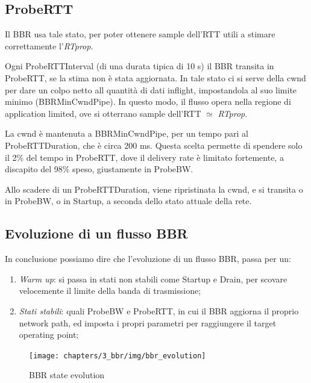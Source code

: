 \subsection{ProbeRTT} \label{ProbeRTT}

Il BBR usa tale stato, per poter ottenere sample dell'RTT utili a stimare correttamente l'\textit{RTprop}. \bigskip

Ogni ProbeRTTInterval (di una durata tipica di 10 s) il BBR transita in ProbeRTT, se la stima non è stata aggiornata. In tale stato ci si serve della cwnd per dare un colpo netto all quantità di dati inflight, impostandola al suo limite minimo (BBRMinCwndPipe). In questo modo, il flusso opera nella regione di application limited, ove si otterrano sample dell'RTT $ \simeq $ \textit{RTprop}. \bigskip

La cwnd è mantenuta a BBRMinCwndPipe, per un tempo pari al ProbeRTTDuration, che è circa 200 ms. Questa scelta permette di spendere solo il 2\% del tempo in ProbeRTT, dove il delivery rate è limitato fortemente, a discapito del 98\% speso, giustamente in ProbeBW. \bigskip

Allo scadere di un ProbeRTTDuration, viene ripristinata la cwnd, e si transita o in ProbeBW, o in Startup, a seconda dello stato attuale della rete.

\subsection{Evoluzione di un flusso BBR}

In conclusione possiamo dire che l'evoluzione di un flusso BBR, passa per un:

\begin{enumerate}

\item \textit{Warm up}: si passa in stati non stabili come Startup e Drain, per scovare velocemente il limite della banda di trasmissione;

\item \textit{Stati stabili}: quali ProbeBW e ProbeRTT, in cui il BBR aggiorna il proprio network path, ed imposta i propri parametri per raggiungere il target operating point;

\end{enumerate}

\begin{figure}[H]

\center
\caption{BBR state evolution}
\texttt{[image: chapters/3\_bbr/img/bbr\_evolution]}

\end{figure}   
